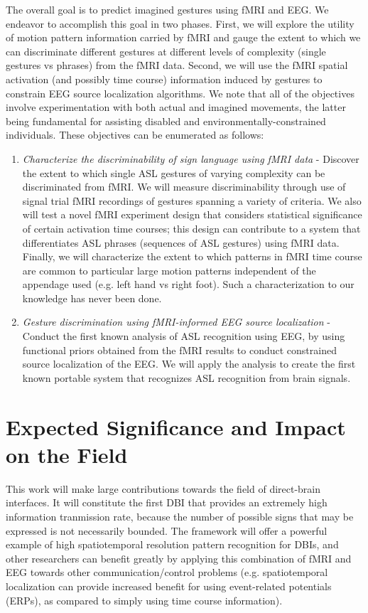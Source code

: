 \documentclass{proposal}
\begin{document}
The overall goal is to predict imagined gestures using fMRI and EEG. We endeavor to accomplish this goal in two phases. First, we will explore the utility of motion pattern information carried by fMRI and gauge the extent to which we can discriminate different gestures at different levels of complexity (single gestures vs phrases) from the fMRI data. Second, we will use the fMRI spatial activation (and possibly time course) information induced by gestures to constrain EEG source localization algorithms. We note that all of the objectives involve experimentation with both actual and imagined movements, the latter being fundamental for assisting disabled and environmentally-constrained individuals. These objectives can be enumerated as follows:

\begin{enumerate}
\item \textit{Characterize the discriminability of sign language using fMRI data} - Discover the extent to which single ASL gestures of varying complexity can be discriminated from fMRI. We will measure discriminability through use of signal trial fMRI recordings of gestures spanning a variety of criteria. We also will test a novel fMRI experiment design that considers statistical significance of certain activation time courses; this design can contribute to a system that differentiates ASL phrases (sequences of ASL gestures) using fMRI data. Finally, we will characterize the extent to which patterns in fMRI time course are common to particular large motion patterns independent of the appendage used (e.g. left hand vs right foot). Such a characterization to our knowledge has never been done.
\item \textit{Gesture discrimination using fMRI-informed EEG source localization} - Conduct the first known analysis of ASL recognition using EEG, by using functional priors obtained from the fMRI results to conduct constrained source localization of the EEG. We will apply the analysis to create the first known portable system that recognizes ASL recognition from brain signals.
\end{enumerate}

\section{Expected Significance and Impact on the Field}
This work will make large contributions towards the field of direct-brain interfaces. It will constitute the first DBI that provides an extremely high information tranmission rate, because the number of possible signs that may be expressed is not necessarily bounded. The framework will offer a powerful example of high spatiotemporal resolution pattern recognition for DBIs, and other researchers can benefit greatly by applying this combination of fMRI and EEG towards other communication/control problems (e.g. spatiotemporal localization can provide increased benefit for using event-related potentials (ERPs), as compared to simply using time course information).
\end{document}
